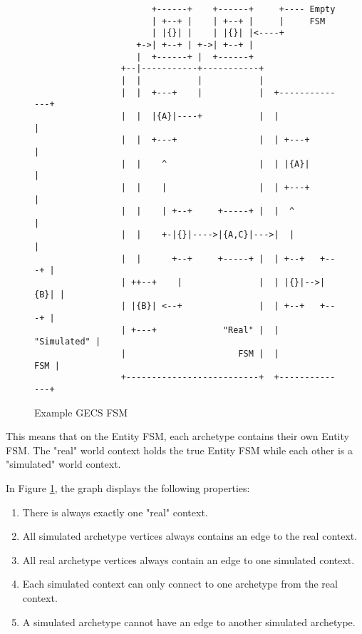 \begin{figure}[htbp]
    \centering
    \begin{verbatim}                                                                            
                       +------+    +------+     +---- Empty                                 
                       | +--+ |    | +--+ |     |     FSM                           
                       | |{}| |    | |{}| |<----+                                     
                    +->| +--+ | +->| +--+ |                                      
                    |  +------+ |  +------+                                      
                 +--|-----------+-----------+                                    
                 |  |           |           |                                    
                 |  |  +---+    |           |  +--------------+                  
                 |  |  |{A}|----+           |  |              |                  
                 |  |  +---+                |  | +---+        |                  
                 |  |    ^                  |  | |{A}|        |                  
                 |  |    |                  |  | +---+        |                  
                 |  |    | +--+     +-----+ |  |  ^           |                  
                 |  |    +-|{}|---->|{A,C}|--->|  |           |                  
                 |  |      +--+     +-----+ |  | +--+   +---+ |                  
                 | ++--+    |               |  | |{}|-->|{B}| |                  
                 | |{B}| <--+               |  | +--+   +---+ |                  
                 | +---+             "Real" |  |  "Simulated" |                  
                 |                      FSM |  |          FSM |                  
                 +--------------------------+  +--------------+                
   \end{verbatim}
    \caption{Example GECS FSM}
    \label{fig:gecs_fsm}
\end{figure}

This means that on the Entity FSM, each archetype contains their own Entity FSM. The "real" world context holds the true Entity FSM while each other is a "simulated" world context.

In Figure \ref{fig:gecs_fsm}, the graph displays the following properties:
\begin{enumerate}
    \item There is always exactly one "real" context.
    \item All simulated archetype vertices always contains an edge to the real context.
    \item All real archetype vertices always contain an edge to one simulated context.
    \item Each simulated context can only connect to one archetype from the real context.
    \item A simulated archetype cannot have an edge to another simulated archetype.
\end{enumerate}

